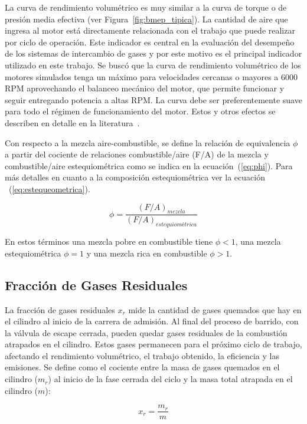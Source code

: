 La curva de rendimiento volumétrico es muy similar a la curva de torque o de
presión media efectiva (ver Figura~\ref{fig:bmep_tipica}).
%
La cantidad de aire que ingresa al motor está directamente relacionada con el
trabajo que puede realizar por ciclo de operación.
%
Este indicador es central en la evaluación del desempeño de los sistemas de
intercambio de gases y por este motivo es el principal indicador utilizado en
este trabajo.
%
Se buscó que la curva de rendimiento volumétrico de los motores simulados tenga
un máximo para velocidades cercanas o mayores a 6000 RPM aprovechando el
balanceo mecánico del motor, que permite funcionar y seguir entregando potencia
a altas RPM.
%
La curva debe ser preferentemente suave para todo el régimen de funcionamiento
del motor.
%
Estos y otros efectos se describen en detalle en la
literatura~\parencite{heywood}.
%

Con respecto a la mezcla aire-combustible, se define la relación
de equivalencia $\phi$ a partir del cociente de relaciones combustible/aire (F/A)
de la mezcla y combustible/aire estequiométrica como se indica en la
ecuación~(\ref{eq:phi}).
%
Para más detalles en cuanto a la composición estequiométrica ver la ecuación
~(\ref{eq:estequeometrica}).

\begin{equation}
  \label{eq:phi}
  \phi = \frac{(F/A)_{mezcla}}{(F/A)_{estequiométrica}}
\end{equation}

En estos términos una mezcla pobre en combustible tiene $\phi < 1$, una mezcla
estequiométrica $\phi=1$ y una mezcla rica en combustible $\phi > 1$.


\subsection{Fracción de Gases Residuales}
%
La fracción de gases residuales $x_r$ mide la cantidad de gases quemados que hay
en el cilindro al inicio de la carrera de admisión.
%
Al final del proceso de barrido, con la válvula de escape cerrada,
pueden quedar gases residuales de la combustión atrapados en el cilindro.
%
Estos gases permanecen para el próximo ciclo de trabajo, afectando el
rendimiento volumétrico, el trabajo obtenido, la eficiencia y las emisiones.
%
Se define como el cociente entre la masa de gases quemados en el cilindro
($m_{r}$) al inicio de la fase cerrada del ciclo y la masa total atrapada en el
cilindro ($m$):


\begin{equation}
    x_{r} = \frac{m_{r}}{m}
\end{equation}

